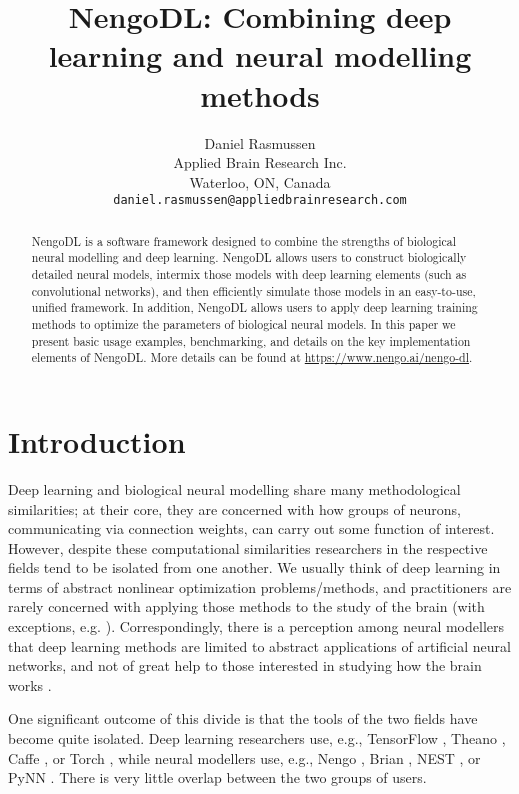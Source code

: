 \documentclass{article}
\title{NengoDL: Combining deep learning and neural modelling methods}
\author{
  Daniel Rasmussen \\
  Applied Brain Research Inc.\\
  Waterloo, ON, Canada \\
  \texttt{daniel.rasmussen@appliedbrainresearch.com}
}
\begin{document}
\maketitle

\begin{abstract}
NengoDL is a software framework designed to combine the strengths of biological neural modelling and deep learning.  NengoDL allows users to construct biologically detailed neural models, intermix those models with deep learning elements (such as convolutional networks), and then efficiently simulate those models in an easy-to-use, unified framework.  In addition, NengoDL allows users to apply deep learning training methods to optimize the parameters of biological neural models.  In this paper we present basic usage examples, benchmarking, and details on the key implementation elements of NengoDL.  More details can be found at \url{https://www.nengo.ai/nengo-dl}.
\end{abstract}

\section{Introduction}

Deep learning and biological neural modelling share many methodological similarities; at their core, they are concerned with how groups of neurons, communicating via connection weights, can carry out some function of interest.  However, despite these computational similarities researchers in the respective fields tend to be isolated from one another.  We usually think of deep learning in terms of abstract nonlinear optimization problems/methods, and practitioners are rarely concerned with applying those methods to the study of the brain (with exceptions, e.g. \citet{Kriegeskorte2015,Yamins2016}).  Correspondingly, there is a perception among neural modellers that deep learning methods are limited to abstract applications of artificial neural networks, and not of great help to those interested in studying how the brain works \citep{Kay2017}.

One significant outcome of this divide is that the tools of the two fields have become quite isolated.  Deep learning researchers use, e.g., TensorFlow \citep{Abadi2016}, Theano \citep{Team2016}, Caffe \citep{Jia2014}, or Torch \citep{Collobert2011}, while neural modellers use, e.g., Nengo \citep{Bekolay2014}, Brian \citep{Stimberg2013}, NEST \citep{Gewaltig2007}, or PyNN \citep{Davison2009}. There is very little overlap between the two groups of users.
\end{document}
